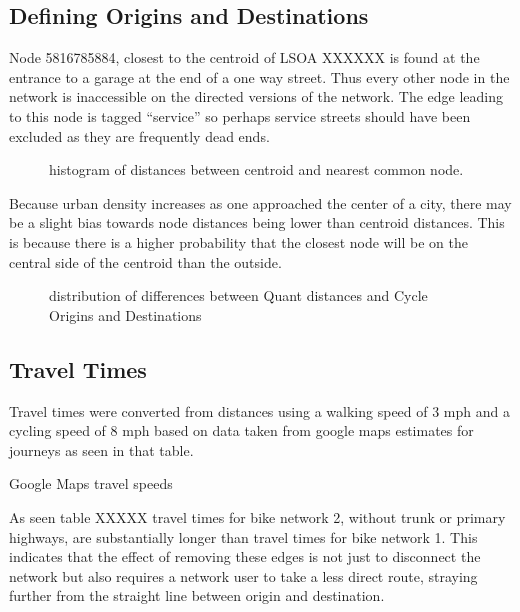\subsection{Defining Origins and Destinations}

Node 5816785884, closest to the centroid of LSOA XXXXXX is found at the entrance to a garage at the end of a one way street. Thus every other node in the network is inaccessible on the directed versions of the network. The edge leading to this node is tagged ``service'' so perhaps service streets should have been excluded as they are frequently dead ends. 

\begin{figure}
\centering
\caption{histogram of distances between centroid and nearest common node. }
\label{fig:centroid_node_dist_hist}
\end{figure}

Because urban density increases as one approached the center of a city, there may be a slight bias towards node distances being lower than centroid distances. This is because there is a higher probability that the closest node will be on the central side of the centroid than the outside. 



\begin{figure}
\centering
\caption{distribution of differences between Quant distances and Cycle Origins and Destinations}
\label{fig:diff_dist}
\end{figure}

\subsection{Travel Times}

Travel times were converted from distances using a walking speed of 3 mph and a cycling speed of 8 mph based on data taken from google maps estimates for journeys as seen in that table. 

\begin{table}
\centering
\caption{Google Maps travel speeds}
\label{table:travel_speeds}
\end{table}

As seen table XXXXX travel times for bike network 2, without trunk or primary highways, are substantially longer than travel times for bike network 1. This indicates that the effect of removing these edges is not just to disconnect the network but also requires a network user to take a less direct route, straying further from the straight line between origin and destination. 

